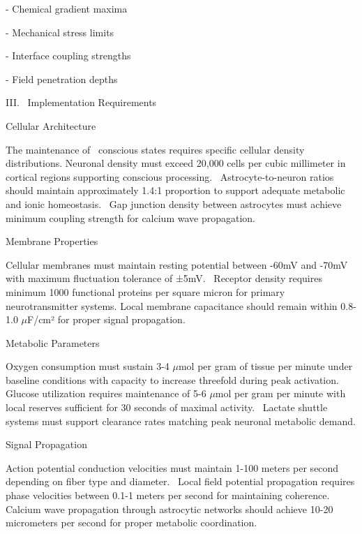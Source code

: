 - Chemical gradient maxima

- Mechanical stress limits

- Interface coupling strengths

- Field penetration depths

III.~ Implementation Requirements

 Cellular Architecture

The maintenance of~ conscious states requires specific cellular density distributions. Neuronal density must exceed 20,000 cells per cubic millimeter in~ cortical regions supporting conscious processing.~ Astrocyte-to-neuron ratios should maintain approximately 1.4:1 proportion to support adequate metabolic and ionic homeostasis.~ Gap junction density between astrocytes must achieve minimum coupling strength for calcium wave propagation.

 Membrane Properties

Cellular membranes must maintain resting potential between -60mV and -70mV with maximum fluctuation tolerance of ±5mV.~ Receptor density requires minimum 1000 functional proteins per square micron for primary neurotransmitter systems. Local membrane capacitance should remain within 0.8-1.0 $\mu$F/cm² for proper signal propagation.

 Metabolic Parameters

Oxygen consumption must sustain 3-4 $\mu$mol per gram of tissue per minute under baseline conditions with capacity to increase threefold during peak activation. Glucose utilization requires maintenance of 5-6 $\mu$mol per gram per minute with local reserves sufficient for 30 seconds of maximal activity.~ Lactate shuttle systems must support clearance rates matching peak neuronal metabolic demand.

 Signal Propagation

 Action potential conduction velocities must maintain 1-100 meters per second depending on fiber type and diameter.~ Local field potential propagation requires phase velocities between 0.1-1 meters per second for maintaining coherence.~ Calcium wave propagation through astrocytic networks should achieve 10-20 micrometers per second for proper metabolic coordination.

